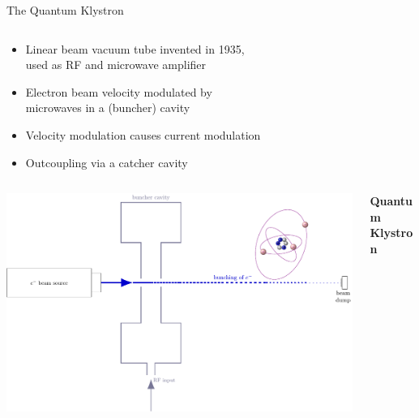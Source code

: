 \documentclass[final]{beamer}
\begin{document}
\begin{frame}[fragile]{}
\begin{columns}[T]
\begin{column}{.49\linewidth}
\begin{block}{\Large The Quantum Klystron}
\begin{columns}
\begin{column}{0.55\columnwidth}
            \begin{itemize}
              \item Linear beam vacuum tube invented in 1935,\\used as RF and microwave amplifier
              \item Electron beam velocity modulated by\\microwaves in a (buncher) cavity
              \item Velocity modulation causes current modulation
              \item Outcoupling via a catcher cavity
            \end{itemize}
          \end{column}
        \end{columns}
        \begin{columns}
          \begin{column}{0.45\columnwidth}
            \includegraphics[width=\columnwidth]{figures/qklystron.pdf}
          \end{column}
          \begin{column}{0.55\columnwidth}
            \begin{center}
              {\large \textbf{Quantum Klystron}}
            \end{center}


\end{column}
\end{columns}
\end{block}
\end{column}
\end{columns}
\end{frame}
\end{document}

